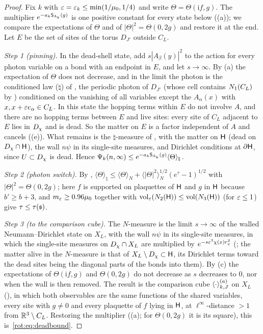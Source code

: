 \begin{proof}
Fix $k$ with $\varepsilon=\varepsilon_k\le\min(1/\mu_0,1/4)$ and write $\Theta=\Theta(\mathrm if,g)$. The multiplier $e^{-a_k\mathsf S_{\Lambda_k}(g)}$ is one positive constant for every state below ((a)); we compare the expectations of $\Theta$ and of $|\Theta|^2=\Theta(0,2g)$ and restore it at the end. Let $E$ be the set of sites of the torus $D_{J'}$ outside $C_L$.

\emph{Step 1 (pinning).} In the dead-shell state, add $s|A_\beta(y)|^2$ to the action for every photon variable on a bond with an endpoint in $E$, and let $s\to\infty$. By (a) the expectation of $\Theta$ does not decrease, and in the limit the photon is the conditioned law ($\natural$) of , the periodic photon of $D_{J'}$ (whose cell contains $N_{1}(C_L)$ by ) conditioned on the vanishing of all variables except the $A_\alpha(x)$ with $x,x+\varepsilon e_\alpha\in C_L$. In this state the hopping terms within $E$ do not involve $A$, and there are no hopping terms between $E$ and live sites: every site of $C_L$ adjacent to $E$ lies in $D_\chi$ and is dead. So the matter on $E$ is a factor independent of $A$ and cancels ((e)). What remains is the $\natural$-measure of , with the matter on $\mathsf H$ (dead on $D_\chi\cap\mathsf H$), the wall $n\psi$ in its single-site measures, and Dirichlet conditions at $\partial\mathsf H$, since $U\subset D_\chi$ is dead. Hence $\Psi_k(n,\infty)\le e^{-a_k\mathsf S_{\Lambda_k}(g)}\langle\Theta\rangle_\natural$.

\emph{Step 2 (photon switch).} By , $\langle\Theta\rangle_\natural\le\langle\Theta\rangle_N+\langle|\Theta|^2\rangle_N^{1/2}(e^{\tau}-1)^{1/2}$ with $|\Theta|^2=\Theta(0,2g)$; here $f$ is supported on plaquettes of $\mathsf H$ and $g$ in $\mathsf H$ because $b'\ge b+3$, and $m_{\varepsilon}\ge0.96\mu_0$ together with $\operatorname{vol}_{\varepsilon}(N_{2}(\mathsf H))\le\operatorname{vol}(N_{3}(\mathsf H))$ (for $\varepsilon\le1$) give $\tau\le\tau(\mathfrak s)$.

\emph{Step 3 (to the comparison cube).} The $N$-measure is the limit $s\to\infty$ of the walled Neumann--Dirichlet state on $X_L$, with the wall $n\psi$ in its single-site measures, in which the single-site measures on $D_\chi\cap X_L$ are multiplied by $e^{-s\varepsilon^3\chi(x)r_x^2}$ (; the matter alive in the $N$-measure is that of $X_L\setminus D_\chi\subset\mathsf H$, its Dirichlet terms toward the dead sites being the diagonal parts of the bonds into them). By (c) the expectations of $\Theta(\mathrm if,g)$ and $\Theta(0,2g)$ do not decrease as $s$ decreases to $0$, nor when the wall is then removed. The result is the comparison cube $\langle \cdot\rangle^{(a)}_{k,J}$ on $X_L$ (), in which both observables are the same functions of the shared variables, every site with $g\ne0$ and every plaquette of $f$ lying in $\mathsf H$, at $\ell^\infty$-distance $>1$ from $\mathbb R^3\setminus C_L$. Restoring the multiplier ((a); for $\Theta(0,2g)$ it is its square), this is~\eqref{rot:eq:deadbound}.


\end{proof}
